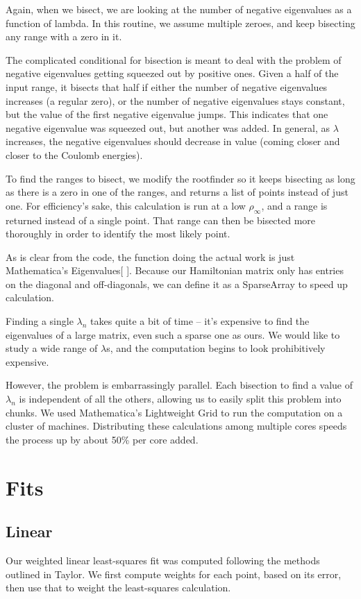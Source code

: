 \documentclass[12pt,twoside]{reedthesis}
\begin{document}
Again, when we bisect, we are looking at the number of negative eigenvalues as a function of lambda. In this routine, we assume multiple zeroes, and keep bisecting any range with a zero in it.

The complicated conditional for bisection is meant to deal with the problem of negative eigenvalues getting squeezed out by positive ones. Given a half of the input range, it bisects that half if either the number of negative eigenvalues increases (a regular zero), or the number of negative eigenvalues stays constant, but the value of the first negative eigenvalue jumps. This indicates that one negative eigenvalue was squeezed out, but another was added. In general, as $\lambda$ increases, the negative eigenvalues should decrease in value (coming closer and closer to the Coulomb energies). 

To find the ranges to bisect, we modify the rootfinder so it keeps bisecting as long as there is a zero in one of the ranges, and returns a list of points instead of just one. For efficiency's sake, this calculation is run at a low $\rho_{\infty}$, and a range is returned instead of a single point. That range can then be bisected more thoroughly in order to identify the most likely point. 

As is clear from the code, the function doing the actual work is just Mathematica's Eigenvalues[ ]. Because our Hamiltonian matrix only has entries on the diagonal and off-diagonals, we can define it as a SparseArray to speed up calculation. 

Finding a single $\lambda_{n}$ takes quite a bit of time -- it's expensive to find the eigenvalues of a large matrix, even such a sparse one as ours. We would like to study a wide range of $\lambda$s, and the computation begins to look prohibitively expensive.

However, the problem is embarrassingly parallel. Each bisection to find a value of $\lambda_n$ is independent of all the others, allowing us to easily split this problem into chunks. We used Mathematica's Lightweight Grid to run the computation on a cluster of machines. Distributing these calculations among multiple cores speeds the process up by about 50\% per core added. 

\section{Fits}
\subsection{Linear}
Our weighted linear least-squares fit was computed following the methods outlined in Taylor\cite{taylor_introduction_1997}. We first compute weights for each point, based on its error, then use that to weight the least-squares calculation.
\end{document}
